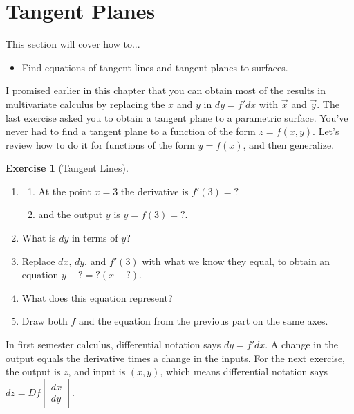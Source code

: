 \documentclass[10pt,]{book}
\theoremstyle{plain}
\theoremstyle{definition}
\theoremstyle{definition}
\theoremstyle{definition}
\theoremstyle{definition}
\newtheorem{exploration}[project]{Exercise}
\theoremstyle{definition}
\numberwithin{equation}{section}
\begin{document}
\section[{Tangent Planes}]{Tangent Planes}\label{section-22}
This section will cover how to... \leavevmode%
\begin{itemize}[label=\textbullet]
\item{}Find equations of tangent lines and tangent planes to surfaces.%
\end{itemize}
%
\par
I promised earlier in this chapter that you can obtain most of the results in multivariate calculus by replacing the \(x\) and \(y\) in \(dy=f'dx\) with \(\vec x\) and \(\vec y\). The last exercise asked you to obtain a tangent plane to a parametric surface. You've never had to find a tangent plane to a function of the form \(z=f(x,y)\). Let's review how to do it for functions of the form \(y=f(x)\), and then generalize.%
\begin{exploration}[Tangent Lines]\label{prob_tangent_line1}
\leavevmode%
\begin{enumerate}[font=\bfseries,label=(\alph*),ref=\alph*]
\item\label{task-312} \begin{enumerate}[font=\bfseries,label=(\roman*),ref=\theenumi.\roman*]
\item\label{task-313} At the point \(x=3\) the derivative is \(f'(3)=?\)%
\item\label{task-314} and the output \(y\) is \(y=f(3)=?\).%
\end{enumerate}
\item\label{task-315} What is \(dy\) in terms of \(y\)?%
\item\label{task-316} Replace \(dx\), \(dy\), and \(f'(3)\) with what we know they equal, to obtain an equation \(y-?=?(x-?)\).%
\item\label{task-317} What does this equation represent?%
\item\label{task-318} Draw both \(f\) and the equation from the previous part on the same axes.%
\end{enumerate}
\end{exploration}
In first semester calculus, differential notation says \(dy=f' dx\). A change in the output equals the derivative times a change in the inputs. For the next exercise, the output is \(z\), and input is \((x,y)\), which means differential notation says \(dz = Df \begin{bmatrix}dx\\dy
\end{bmatrix}\).%
\end{document}
